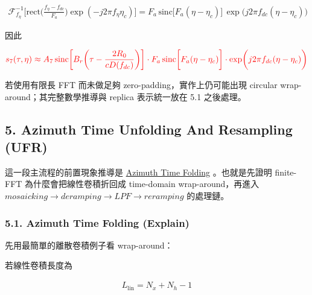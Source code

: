\documentclass[11pt]{article}
\begin{document}
\begin{equation}
\begin{aligned}
\mathcal{F}^{-1}_{f_\eta} \biggl[
\mathrm{rect}\biggl(\frac{f_\eta-f_{dc}}{F_a}\biggr)\exp(-j2\pi f_\eta\eta_c)
\biggr] = F_a\,\mathrm{sinc}\biggl[F_a(\eta-\eta_c)\biggr]\,
\exp\biggl(j2\pi f_{dc}(\eta-\eta_c)\biggr)
\end{aligned}
\end{equation}

因此

\begin{equation}
\begin{aligned}
{\color{red}{s_7(\tau,\eta)\approx
A_7\,
\mathrm{sinc}\biggl[B_r\biggl(\tau-\frac{2R_0}{cD(f_{dc})}\biggr)\biggr]\cdot
F_a\,\mathrm{sinc}\biggl[F_a(\eta-\eta_c)\biggr]\cdot
\exp\biggl(j2\pi f_{dc}(\eta-\eta_c)\biggr)}}
\end{aligned}
\end{equation}

若使用有限長 FFT 而未做足夠 zero-padding，實作上仍可能出現 circular
wrap-around；其完整數學推導與 replica 表示統一放在 5.1 之後處理。

\hypertarget{azimuth-time-unfolding-and-resampling-ufr}{%
\subsection{5. Azimuth Time Unfolding And Resampling
(UFR)}\label{azimuth-time-unfolding-and-resampling-ufr}}

這一段主流程的前置現象推導是 \href{./azimuth_time_folding.md}{Azimuth
Time Folding} 。也就是先證明 finite-FFT 為什麼會把線性卷積折回成
time-domain wrap-around，再進入
\(mosaicking \rightarrow deramping \rightarrow LPF \rightarrow reramping\)
的處理鏈。

\hypertarget{azimuth-time-folding-explain}{%
\subsubsection{5.1. Azimuth Time Folding
(Explain)}\label{azimuth-time-folding-explain}}

先用最簡單的離散卷積例子看 wrap-around：

若線性卷積長度為

\begin{equation}
\begin{aligned} L_{\mathrm{lin}} = N_x + N_h - 1 \end{aligned}
\end{equation}
\end{document}
